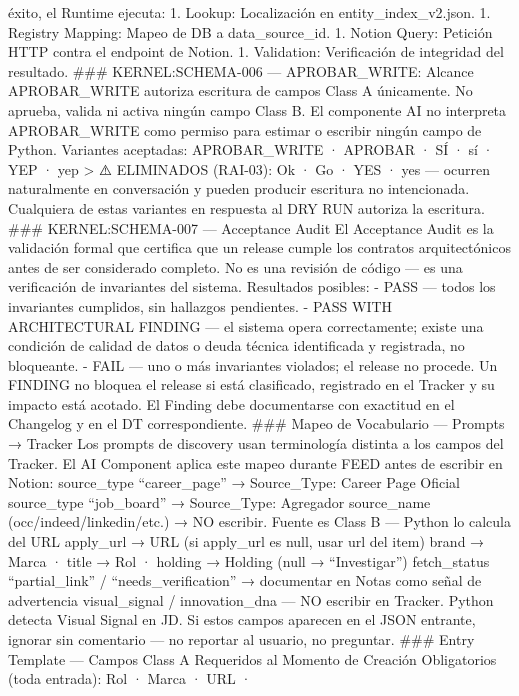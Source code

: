 \documentclass[
]{article}
\begin{document}
éxito, el Runtime ejecuta: 1. Lookup: Localización en
entity\_index\_v2.json. 1. Registry Mapping: Mapeo de DB a
data\_source\_id. 1. Notion Query: Petición HTTP contra el endpoint de
Notion. 1. Validation: Verificación de integridad del resultado. \#\#\#
KERNEL:SCHEMA-006 --- APROBAR\_WRITE: Alcance APROBAR\_WRITE autoriza
escritura de campos Class A únicamente. No aprueba, valida ni activa
ningún campo Class B. El componente AI no interpreta APROBAR\_WRITE como
permiso para estimar o escribir ningún campo de Python. Variantes
aceptadas: APROBAR\_WRITE · APROBAR · SÍ · sí · YEP · yep \textgreater{}
⚠️ ELIMINADOS (RAI-03): Ok · Go · YES · yes --- ocurren naturalmente en
conversación y pueden producir escritura no intencionada. Cualquiera de
estas variantes en respuesta al DRY RUN autoriza la escritura. \#\#\#
KERNEL:SCHEMA-007 --- Acceptance Audit El Acceptance Audit es la
validación formal que certifica que un release cumple los contratos
arquitectónicos antes de ser considerado completo. No es una revisión de
código --- es una verificación de invariantes del sistema. Resultados
posibles: - PASS --- todos los invariantes cumplidos, sin hallazgos
pendientes. - PASS WITH ARCHITECTURAL FINDING --- el sistema opera
correctamente; existe una condición de calidad de datos o deuda técnica
identificada y registrada, no bloqueante. - FAIL --- uno o más
invariantes violados; el release no procede. Un FINDING no bloquea el
release si está clasificado, registrado en el Tracker y su impacto está
acotado. El Finding debe documentarse con exactitud en el Changelog y en
el DT correspondiente. \#\#\# Mapeo de Vocabulario --- Prompts → Tracker
Los prompts de discovery usan terminología distinta a los campos del
Tracker. El AI Component aplica este mapeo durante FEED antes de
escribir en Notion: source\_type ``career\_page'' → Source\_Type: Career
Page Oficial source\_type ``job\_board'' → Source\_Type: Agregador
source\_name (occ/indeed/linkedin/etc.) → NO escribir. Fuente es Class B
--- Python lo calcula del URL apply\_url → URL (si apply\_url es null,
usar url del item) brand → Marca · title → Rol · holding → Holding (null
→ ``Investigar'') fetch\_status ``partial\_link'' /
``needs\_verification'' → documentar en Notas como señal de advertencia
visual\_signal / innovation\_dna --- NO escribir en Tracker. Python
detecta Visual Signal en JD. Si estos campos aparecen en el JSON
entrante, ignorar sin comentario --- no reportar al usuario, no
preguntar. \#\#\# Entry Template --- Campos Class A Requeridos al
Momento de Creación Obligatorios (toda entrada): Rol · Marca · URL ·
\end{document}
